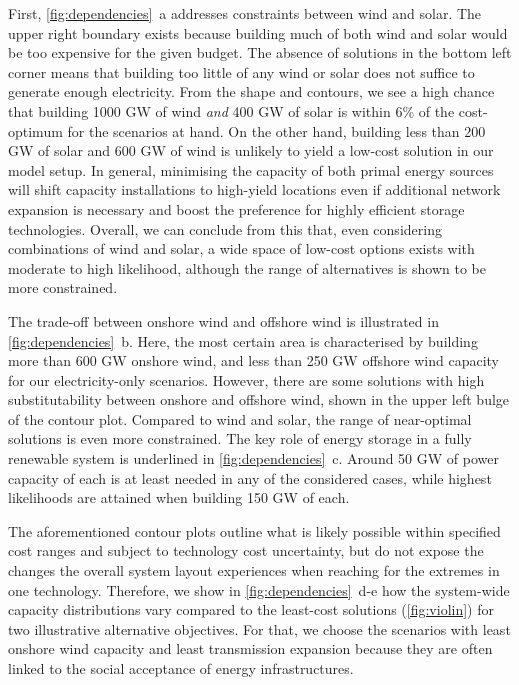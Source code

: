 First, \cref{fig:dependencies}~a addresses constraints between wind and solar.
The upper right boundary exists because building much of both wind and solar
would be too expensive for the given budget. The absence of solutions in the
bottom left corner means that building too little of any wind or solar does not
suffice to generate enough electricity. From the shape and contours, we see a
high chance that building 1000 GW of wind \textit{and} 400 GW of solar is within
6\% of the cost-optimum for the scenarios at hand. On the other hand, building
less than 200 GW of solar and 600 GW of wind is unlikely to yield a low-cost
solution in our model setup. In general, minimising the capacity of both primal
energy sources will shift capacity installations to high-yield locations even if
additional network expansion is necessary and boost the preference for highly
efficient storage technologies. Overall, we can conclude from this that, even
considering combinations of wind and solar, a wide space of low-cost options
exists with moderate to high likelihood, although the range of alternatives is
shown to be more constrained.

The trade-off between onshore wind and offshore wind is illustrated in
\cref{fig:dependencies}~b. Here, the most certain area is characterised by
building more than 600 GW onshore wind, and less than 250 GW offshore wind
capacity for our electricity-only scenarios. However, there are some solutions
with high substitutability between onshore and offshore wind, shown in the upper
left bulge of the contour plot. Compared to wind and solar, the range of
near-optimal solutions is even more constrained. The key role of energy storage
in a fully renewable system is underlined in \cref{fig:dependencies}~c. Around
50 GW of power capacity of each is at least needed in any of the considered
cases, while highest likelihoods are attained when building 150 GW of each.


The aforementioned contour plots 
outline what is likely possible within specified cost ranges and subject to
technology cost uncertainty, but do not expose the changes the overall system
layout experiences when reaching for the extremes in one technology. Therefore,
we show in \cref{fig:dependencies}~d-e how
the system-wide capacity distributions vary compared to the least-cost solutions
(\cref{fig:violin}) for two illustrative alternative objectives. For that, we
choose the scenarios with least onshore wind capacity and least transmission
expansion because they are often linked to the social acceptance of energy
infrastructures.


